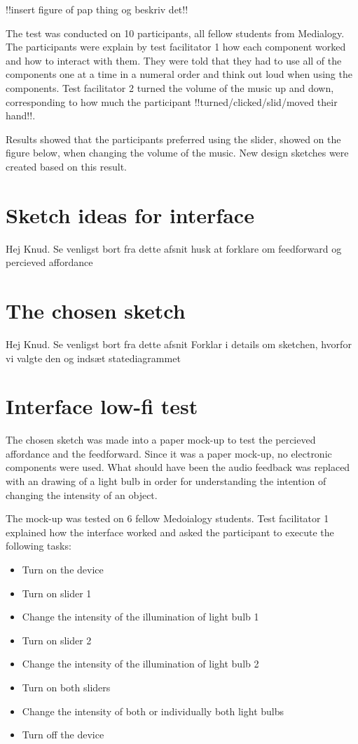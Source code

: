 !!insert figure of pap thing og beskriv det!!

The test was conducted on 10 participants, all fellow students from Medialogy. The participants were explain by test facilitator 1 how each component worked and how to interact with them. They were told that they had to use all of the components one at a time in a numeral order and think out loud when using the components. Test facilitator 2 turned the volume of the music up and down, corresponding to how much the participant !!turned/clicked/slid/moved their hand!!.

Results showed that the participants preferred using the slider, showed on the figure below, when changing the volume of the music. New design sketches were created based on this result.

\section{Sketch ideas for interface}
Hej Knud. Se venligst bort fra dette afsnit
husk at forklare om feedforward og percieved affordance

\section{The chosen sketch}
Hej Knud. Se venligst bort fra dette afsnit
Forklar i details om sketchen, hvorfor vi valgte den og indsæt statediagrammet

\section{Interface low-fi test}
The chosen sketch was made into a paper mock-up to test the percieved affordance and the feedforward. Since it was a paper mock-up, no electronic components were used. What should have been the audio feedback was replaced with an drawing of a light bulb in order for understanding the intention of changing the intensity of an object. 

The mock-up was tested on 6 fellow Medoialogy students. Test facilitator 1 explained how the interface worked and asked the participant to execute the following tasks:
\begin{itemize}
\item Turn on the device
\item Turn on slider 1
\item Change the intensity of the illumination of light bulb 1
\item Turn on slider 2
\item Change the intensity of the illumination of light bulb 2
\item Turn on both sliders
\item Change the intensity of both or individually both light bulbs
\item Turn off the device
\end{itemize}





